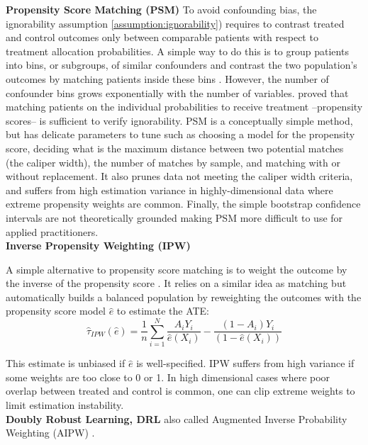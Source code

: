 \documentclass[10pt,letterpaper]{article}
\begin{document}
\textbf{Propensity Score Matching (PSM)} To avoid confounding bias, the
ignorability assumption \ref{assumption:ignorability}) requires to contrast
treated and control outcomes only between comparable patients with respect to
treatment allocation probabilities. A simple way to do this is to group
patients into bins, or subgroups, of similar confounders and contrast the two
population's outcomes by matching patients inside these bins
\cite{stuart2010matching}. However, the number of confounder bins grows
exponentially with the number of variables. \cite{rosenbaum1983central} proved
that matching patients on the individual probabilities to receive treatment
--propensity scores-- is sufficient to verify ignorability. PSM is a
conceptually simple method, but has delicate parameters to tune such as
choosing a model for the propensity score, deciding what is the maximum
distance between two potential matches (the caliper width), the number of
matches by sample, and matching with or without replacement. It also prunes data
not meeting the caliper width criteria, and suffers from high estimation
variance in highly-dimensional data where extreme propensity weights are common.
Finally, the simple bootstrap confidence intervals are not theoretically
grounded \cite{abadie2008failure} making PSM more difficult
to use for applied practitioners.\\

\textbf{Inverse Propensity Weighting (IPW)}

A simple alternative to propensity score matching is to weight the outcome by
the inverse of the propensity score \cite{austin2015moving}. It relies on a
similar idea as matching but automatically builds a balanced population by
reweighting the outcomes with the propensity score model $\hat{e}$ to estimate
the ATE:
\begin{equation}
  \hat \tau_{IPW}(\hat e) = \frac{1}{n} \sum_{i=1}^N \frac{A_i Y_i}{\hat e(X_i)} - \frac{(1-A_i)Y_i}{(1-\hat e(X_i))}
\end{equation}

This estimate is unbiased if $\hat e$ is well-specified. IPW suffers from high
variance if some weights are too close to 0 or 1. In high dimensional cases
where poor overlap between treated and control is common, one can clip extreme
weights to limit estimation instability.\\


\textbf{Doubly Robust Learning, DRL} also called Augmented Inverse
Probability Weighting (AIPW) \cite{robins1994estimation}.
\end{document}
